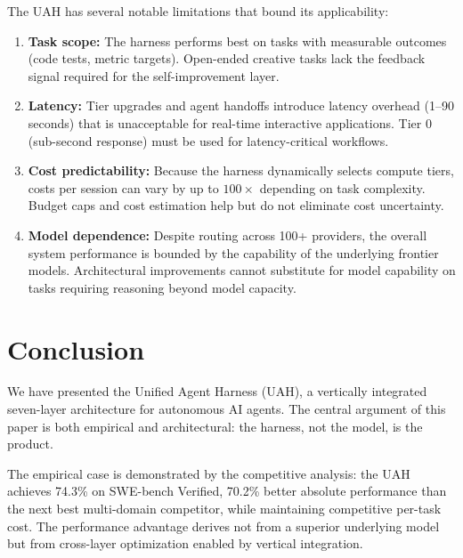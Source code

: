 \documentclass[11pt]{article}
\begin{document}
The UAH has several notable limitations that bound its applicability:

\begin{enumerate}[leftmargin=1.5em]
    \item \textbf{Task scope:} The harness performs best on tasks with
          measurable outcomes (code tests, metric targets). Open-ended creative
          tasks lack the feedback signal required for the self-improvement layer.
    \item \textbf{Latency:} Tier upgrades and agent handoffs introduce latency
          overhead (1--90 seconds) that is unacceptable for real-time
          interactive applications. Tier 0 (sub-second response) must be used
          for latency-critical workflows.
    \item \textbf{Cost predictability:} Because the harness dynamically selects
          compute tiers, costs per session can vary by up to $100\times$
          depending on task complexity. Budget caps and cost estimation help
          but do not eliminate cost uncertainty.
    \item \textbf{Model dependence:} Despite routing across 100+ providers,
          the overall system performance is bounded by the capability of the
          underlying frontier models. Architectural improvements cannot
          substitute for model capability on tasks requiring reasoning beyond
          model capacity.
\end{enumerate}

\section{Conclusion}
\label{sec:conclusion}

We have presented the Unified Agent Harness (UAH), a vertically integrated
seven-layer architecture for autonomous AI agents. The central argument of
this paper is both empirical and architectural: the harness, not the model,
is the product.

The empirical case is demonstrated by the competitive analysis: the UAH
achieves 74.3\% on SWE-bench Verified, 70.2\% better absolute performance
than the next best multi-domain competitor, while maintaining competitive
per-task cost. The performance advantage derives not from a superior
underlying model but from cross-layer optimization enabled by vertical
integration.
\end{document}
